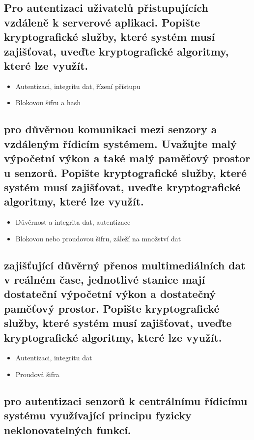 \subsection{Pro autentizaci uživatelů přistupujících vzdáleně k serverové aplikaci. Popište kryptografické služby, které systém musí zajišťovat, uveďte kryptografické algoritmy, které lze využít.}

\begin{itemize}
    \item Autentizaci, integritu dat, řízení přístupu
    \item Blokovou šifru a hash
\end{itemize}

\subsection{pro důvěrnou komunikaci mezi senzory a vzdáleným řídicím systémem. Uvažujte malý výpočetní výkon a také malý paměťový prostor u senzorů. Popište kryptografické služby, které systém musí zajišťovat, uveďte kryptografické algoritmy, které lze využít.}

\begin{itemize}
    \item Důvěrnost a integrita dat, autentizace
    \item Blokovou nebo proudovou šifru, záleží na množství dat
\end{itemize}

\subsection{zajišťující důvěrný přenos multimediálních dat v reálném čase, jednotlivé stanice mají dostateční výpočetní výkon a dostatečný paměťový prostor. Popište kryptografické služby, které systém musí zajišťovat, uveďte kryptografické algoritmy, které lze využít.}

\begin{itemize}
    \item Autentizaci, integritu dat
    \item Proudová šifra
\end{itemize}

\subsection{pro autentizaci senzorů k centrálnímu řídicímu systému využívající principu fyzicky neklonovatelných funkcí.}


